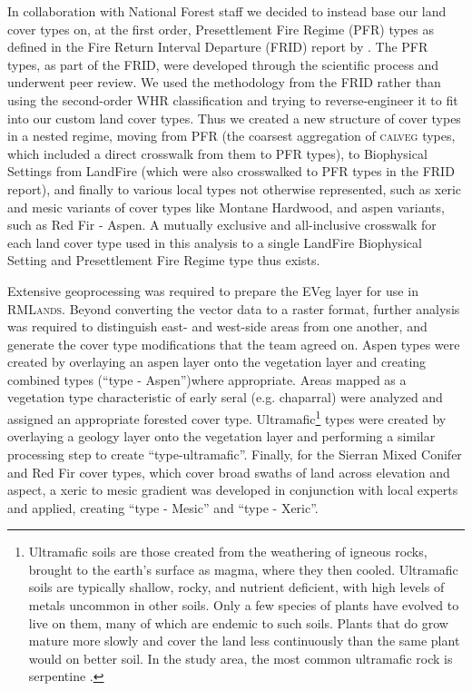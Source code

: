 %
In collaboration with National Forest staff we decided to instead base our land cover types on, at the first order, Presettlement Fire Regime (PFR) types as defined in the Fire Return Interval Departure (FRID) report by \citet{VandeWater2011}. The PFR types, as part of the FRID, were developed through the scientific process and underwent peer review. We used the methodology from the FRID rather than using the second-order WHR classification and trying to reverse-engineer it to fit into our custom land cover types. Thus we created a new structure of cover types in a nested regime, moving from PFR (the coarsest aggregation of \textsc{calveg} types, which included a direct crosswalk from them to PFR types), to Biophysical Settings from LandFire (which were also crosswalked to PFR types in the FRID report), and finally to various local types not otherwise represented, such as xeric and mesic variants of cover types like Montane Hardwood, and aspen variants, such as Red Fir - Aspen. A mutually exclusive and all-inclusive crosswalk for each land cover type used in this analysis to a single LandFire Biophysical Setting and Presettlement Fire Regime type thus exists.

Extensive geoprocessing was required to prepare the EVeg layer for use in \textsc{RMLands}. Beyond converting the vector data to a raster format, further analysis was required to distinguish east- and west-side areas from one another, and generate the cover type modifications that the team agreed on. Aspen types were created by overlaying an aspen layer onto the vegetation layer and creating combined types (``type - Aspen'')where appropriate. Areas mapped as a vegetation type characteristic of early seral (e.g. chaparral) were analyzed and assigned an appropriate forested cover type. Ultramafic\footnote{Ultramafic soils are those created from the weathering of igneous rocks, brought to the earth's surface as magma, where they then cooled. Ultramafic soils are typically shallow, rocky, and nutrient deficient, with high levels of metals uncommon in other soils. Only a few species of plants have evolved to live on them, many of which are endemic to such soils. Plants that do grow mature more slowly and cover the land less continuously than the same plant would on better soil. In the study area, the most common ultramafic rock is serpentine \citep{Safford2004}.} types were created by overlaying a geology layer onto the vegetation layer and performing a similar processing step to create ``type-ultramafic''. Finally, for the Sierran Mixed Conifer and Red Fir cover types, which cover broad swaths of land across elevation and aspect, a xeric to mesic gradient was developed in conjunction with local experts and applied, creating ``type - Mesic'' and ``type - Xeric''. 

